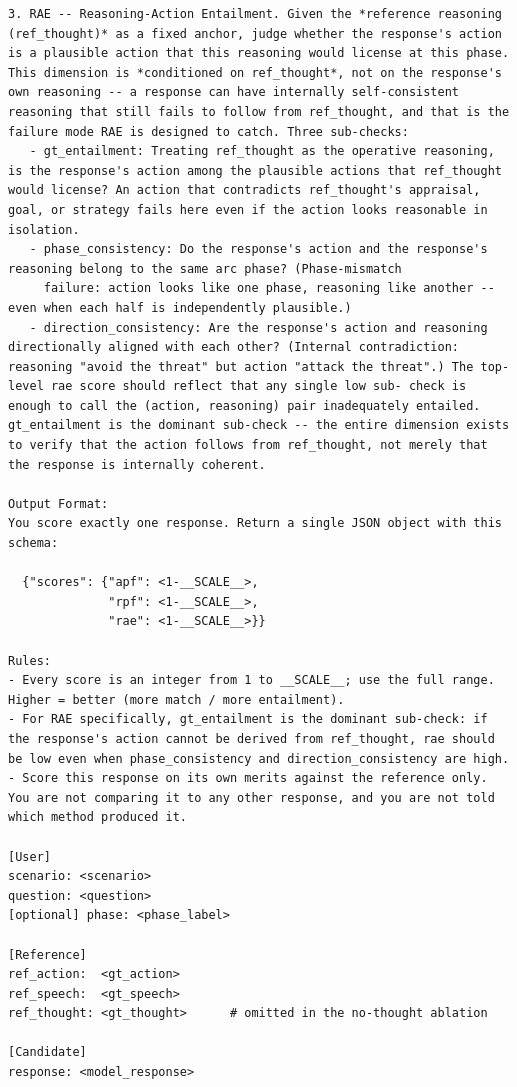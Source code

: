 \documentclass{llmxive}
\begin{document}
\begin{table}[htbp]
\begin{lstlisting}[basicstyle=\ttfamily\scriptsize]
3. RAE -- Reasoning-Action Entailment. Given the *reference reasoning (ref_thought)* as a fixed anchor, judge whether the response's action is a plausible action that this reasoning would license at this phase. This dimension is *conditioned on ref_thought*, not on the response's own reasoning -- a response can have internally self-consistent reasoning that still fails to follow from ref_thought, and that is the failure mode RAE is designed to catch. Three sub-checks:
   - gt_entailment: Treating ref_thought as the operative reasoning, is the response's action among the plausible actions that ref_thought would license? An action that contradicts ref_thought's appraisal, goal, or strategy fails here even if the action looks reasonable in isolation.
   - phase_consistency: Do the response's action and the response's reasoning belong to the same arc phase? (Phase-mismatch
     failure: action looks like one phase, reasoning like another -- even when each half is independently plausible.)
   - direction_consistency: Are the response's action and reasoning directionally aligned with each other? (Internal contradiction: reasoning "avoid the threat" but action "attack the threat".) The top-level rae score should reflect that any single low sub- check is enough to call the (action, reasoning) pair inadequately entailed. gt_entailment is the dominant sub-check -- the entire dimension exists to verify that the action follows from ref_thought, not merely that the response is internally coherent.

Output Format:
You score exactly one response. Return a single JSON object with this schema:

  {"scores": {"apf": <1-__SCALE__>,
              "rpf": <1-__SCALE__>,
              "rae": <1-__SCALE__>}}

Rules:
- Every score is an integer from 1 to __SCALE__; use the full range. Higher = better (more match / more entailment).
- For RAE specifically, gt_entailment is the dominant sub-check: if the response's action cannot be derived from ref_thought, rae should be low even when phase_consistency and direction_consistency are high.
- Score this response on its own merits against the reference only. You are not comparing it to any other response, and you are not told which method produced it.

[User]
scenario: <scenario>
question: <question>
[optional] phase: <phase_label>

[Reference]
ref_action:  <gt_action>
ref_speech:  <gt_speech>
ref_thought: <gt_thought>      # omitted in the no-thought ablation

[Candidate]
response: <model_response>
\end{lstlisting}
\caption{Per-response evaluator (APF / RPF / RAE). \texttt{\_\_SCALE\_\_} is replaced with the configured score maximum (100 by default) at runtime.}
\label{tab:prompt-judge-per-response}
\end{table}
\end{document}
